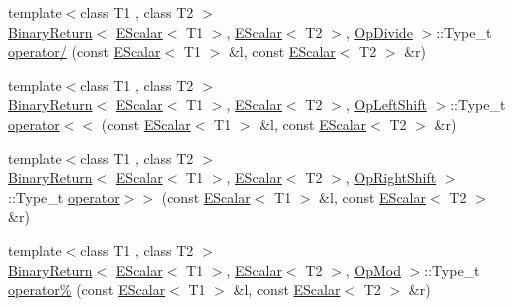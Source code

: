 \begin{DoxyCompactItemize}
\item 
{\footnotesize template$<$class T1 , class T2 $>$ }\\\mbox{\hyperlink{structENSEM_1_1BinaryReturn}{Binary\+Return}}$<$ \mbox{\hyperlink{classENSEM_1_1EScalar}{E\+Scalar}}$<$ T1 $>$, \mbox{\hyperlink{classENSEM_1_1EScalar}{E\+Scalar}}$<$ T2 $>$, \mbox{\hyperlink{structENSEM_1_1OpDivide}{Op\+Divide}} $>$\+::Type\+\_\+t \mbox{\hyperlink{group__escalar_ga6afeb39f3b92a8cfc99b5dc1689d0488}{operator/}} (const \mbox{\hyperlink{classENSEM_1_1EScalar}{E\+Scalar}}$<$ T1 $>$ \&l, const \mbox{\hyperlink{classENSEM_1_1EScalar}{E\+Scalar}}$<$ T2 $>$ \&r)
\item 
{\footnotesize template$<$class T1 , class T2 $>$ }\\\mbox{\hyperlink{structENSEM_1_1BinaryReturn}{Binary\+Return}}$<$ \mbox{\hyperlink{classENSEM_1_1EScalar}{E\+Scalar}}$<$ T1 $>$, \mbox{\hyperlink{classENSEM_1_1EScalar}{E\+Scalar}}$<$ T2 $>$, \mbox{\hyperlink{structENSEM_1_1OpLeftShift}{Op\+Left\+Shift}} $>$\+::Type\+\_\+t \mbox{\hyperlink{group__escalar_ga70b4aa1415cb636de9b4b0d56d26486b}{operator$<$$<$}} (const \mbox{\hyperlink{classENSEM_1_1EScalar}{E\+Scalar}}$<$ T1 $>$ \&l, const \mbox{\hyperlink{classENSEM_1_1EScalar}{E\+Scalar}}$<$ T2 $>$ \&r)
\item 
{\footnotesize template$<$class T1 , class T2 $>$ }\\\mbox{\hyperlink{structENSEM_1_1BinaryReturn}{Binary\+Return}}$<$ \mbox{\hyperlink{classENSEM_1_1EScalar}{E\+Scalar}}$<$ T1 $>$, \mbox{\hyperlink{classENSEM_1_1EScalar}{E\+Scalar}}$<$ T2 $>$, \mbox{\hyperlink{structENSEM_1_1OpRightShift}{Op\+Right\+Shift}} $>$\+::Type\+\_\+t \mbox{\hyperlink{group__escalar_gacaa61f35659a0336281352bbdbef1112}{operator$>$$>$}} (const \mbox{\hyperlink{classENSEM_1_1EScalar}{E\+Scalar}}$<$ T1 $>$ \&l, const \mbox{\hyperlink{classENSEM_1_1EScalar}{E\+Scalar}}$<$ T2 $>$ \&r)
\item 
{\footnotesize template$<$class T1 , class T2 $>$ }\\\mbox{\hyperlink{structENSEM_1_1BinaryReturn}{Binary\+Return}}$<$ \mbox{\hyperlink{classENSEM_1_1EScalar}{E\+Scalar}}$<$ T1 $>$, \mbox{\hyperlink{classENSEM_1_1EScalar}{E\+Scalar}}$<$ T2 $>$, \mbox{\hyperlink{structENSEM_1_1OpMod}{Op\+Mod}} $>$\+::Type\+\_\+t \mbox{\hyperlink{group__escalar_ga970051624cd8616f50a03dcaa2fdc4db}{operator\%}} (const \mbox{\hyperlink{classENSEM_1_1EScalar}{E\+Scalar}}$<$ T1 $>$ \&l, const \mbox{\hyperlink{classENSEM_1_1EScalar}{E\+Scalar}}$<$ T2 $>$ \&r)
\item 

\end{DoxyCompactItemize}
